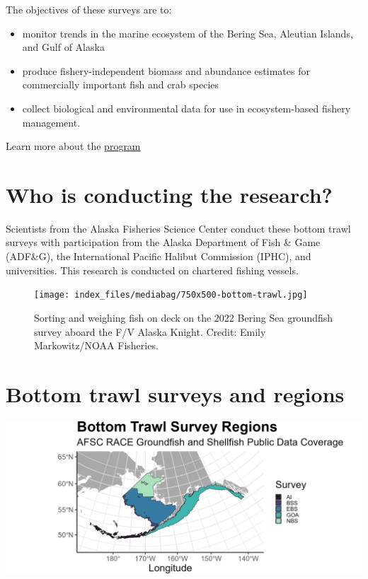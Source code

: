 \documentclass[
  letterpaper,
  oneside,
  open=any]{scrbook}
\providecommand{\tightlist}{%
  \setlength{\itemsep}{0pt}\setlength{\parskip}{0pt}}\usepackage{longtable,booktabs,array}
\begin{document}
The objectives of these surveys are to:

\begin{itemize}
\tightlist
\item
  monitor trends in the marine ecosystem of the Bering Sea, Aleutian
  Islands, and Gulf of Alaska
\item
  produce fishery-independent biomass and abundance estimates for
  commercially important fish and crab species
\item
  collect biological and environmental data for use in ecosystem-based
  fishery management.
\end{itemize}

Learn more about the
\href{https://www.fisheries.noaa.gov/alaska/science-data/groundfish-assessment-program-bottom-trawl-surveys}{program}

\hypertarget{who-is-conducting-the-research}{%
\section{Who is conducting the
research?}\label{who-is-conducting-the-research}}

Scientists from the Alaska Fisheries Science Center conduct these bottom
trawl surveys with participation from the Alaska Department of Fish \&
Game (ADF\&G), the International Pacific Halibut Commission (IPHC), and
universities. This research is conducted on chartered fishing vessels.

\begin{figure}

{\centering \texttt{[image: index\_files/mediabag/750x500-bottom-trawl.jpg]}

}

\caption{Sorting and weighing fish on deck on the 2022 Bering Sea
groundfish survey aboard the F/V Alaska Knight. Credit: Emily
Markowitz/NOAA Fisheries.}

\end{figure}

\hypertarget{bottom-trawl-surveys-and-regions}{%
\section{Bottom trawl surveys and
regions}\label{bottom-trawl-surveys-and-regions}}

\includegraphics[width=7in,height=\textheight]{content/../img/survey_plot.png}
\end{document}

